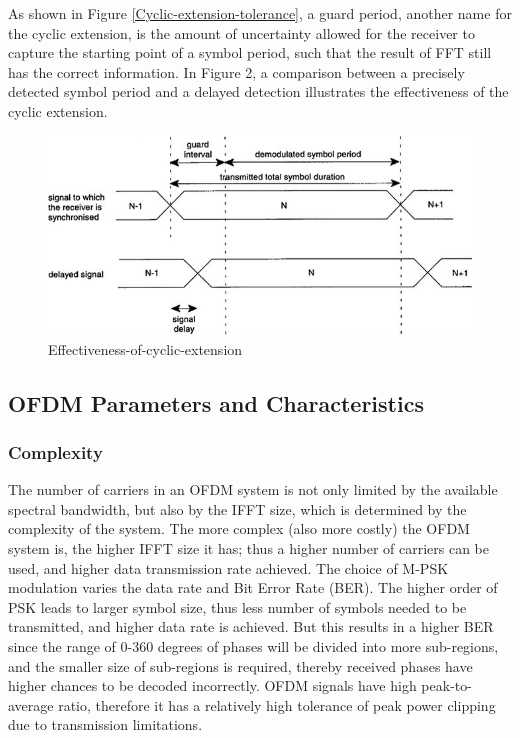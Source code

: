 As shown in Figure \ref{Cyclic-extension-tolerance}, a guard period, another name for the cyclic extension, is the amount of uncertainty allowed for the receiver to capture the starting point of a symbol period, such that the result of FFT still has the correct information. In Figure 2, a comparison between a precisely detected symbol period and a delayed detection illustrates the effectiveness of the cyclic extension.

\begin{figure}[ht]
    \centering
    \includegraphics[width=\textwidth]{Figures/Effectiveness-of-cyclic-extension.jpg}
    \caption{Effectiveness-of-cyclic-extension}
    \label{Effectiveness-of-cyclic-extension}
\end{figure}

\subsection{OFDM Parameters and Characteristics}

\subsubsection{Complexity}

The number of carriers in an OFDM system is not only limited by the available spectral bandwidth, but also by the IFFT size, which is determined by the complexity of the system. The more complex (also more costly) the OFDM system is, the higher IFFT size it has; thus a higher number of carriers can be used, and higher data transmission rate achieved. The choice of M-PSK modulation varies the data rate and Bit Error Rate (BER). The higher order of PSK leads to larger symbol size, thus less number of symbols needed to be transmitted, and higher data rate is achieved. But this results in a higher BER since the range of 0-360 degrees of phases will be divided into more sub-regions, and the smaller size of sub-regions is required, thereby received phases have higher chances to be decoded incorrectly. OFDM signals have high peak-to-average ratio, therefore it has a relatively high tolerance of peak power clipping due to transmission limitations.

